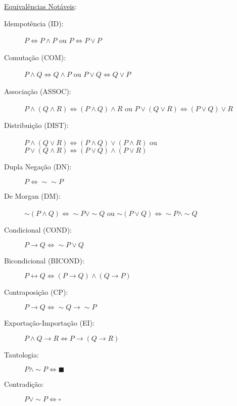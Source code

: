 \documentclass[12pt]{article}
\begin{document}
\underline{Equivalências Notáveis}:
\begin{description}
\item[Idempotência (ID):] $P\Leftrightarrow P\wedge P$ ou $P\Leftrightarrow P\vee P$
\item[Comutação (COM):] $P\wedge Q\Leftrightarrow Q\wedge P$ ou $P\vee Q\Leftrightarrow Q\vee P$
\item[Associação (ASSOC):] $P\wedge(Q\wedge R)\Leftrightarrow (P\wedge Q)\wedge R$ ou $P\vee(Q\vee R)\Leftrightarrow (P\vee Q)\vee R$ 
\item[Distribuição (DIST):] $P\wedge(Q\vee R)\Leftrightarrow (P\wedge Q)\vee (P \wedge R)$ ou $P\vee(Q\wedge R)\Leftrightarrow (P\vee Q)\wedge (P\vee R)$
\item[Dupla Negação (DN):] $P\Leftrightarrow\sim\sim P$
\item[De Morgan (DM):] $\sim(P \wedge Q) \Leftrightarrow \sim P \vee\sim Q$ ou $\sim(P \vee Q) \Leftrightarrow \sim P \wedge\sim Q$
\item[Condicional (COND):] $P\rightarrow Q \Leftrightarrow\sim P \vee Q$

\item[Bicondicional (BICOND):] $P\leftrightarrow Q \Leftrightarrow (P\rightarrow Q)\wedge(Q\rightarrow P)$

\item[Contraposição (CP):] $P\rightarrow Q \Leftrightarrow \sim Q\rightarrow\sim P$

\item[Exportação-Importação (EI):] $P\wedge Q\rightarrow R \Leftrightarrow P\rightarrow(Q\rightarrow R)$

\item[Tautologia:] $P\wedge \sim P \Leftrightarrow \blacksquare  $

\item[Contradição:] $ P\vee \sim P \Leftrightarrow \square  $


\end{description}
%
\end{document}
